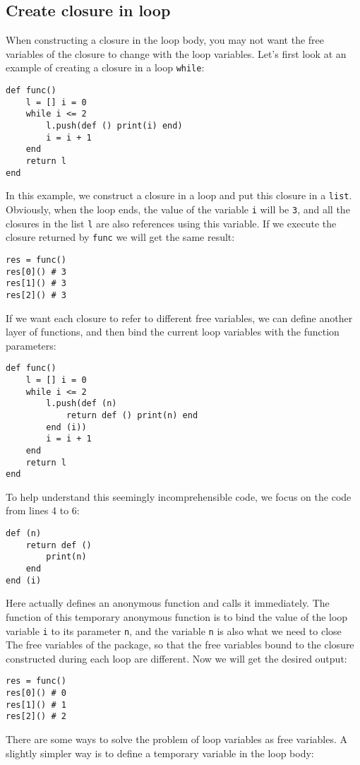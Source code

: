 \subsection {Create closure in loop}When constructing a closure in the loop body, you may not want the free variables of the closure to change with the loop variables. Let's first look at an example of creating a closure in a loop \texttt{while}:
\begin{lstlisting}[language=berry]
def func()
    l = [] i = 0
    while i <= 2
        l.push(def () print(i) end)
        i = i + 1
    end
    return l
end
\end{lstlisting}
In this example, we construct a closure in a loop and put this closure in a \texttt{list}. Obviously, when the loop ends, the value of the variable \texttt{i} will be \texttt{3}, and all the closures in the list \texttt{l} are also references using this variable. If we execute the closure returned by \texttt{func} we will get the same result:
\begin{lstlisting}[language=berry]
res = func()
res[0]() # 3
res[1]() # 3
res[2]() # 3
\end{lstlisting}
If we want each closure to refer to different free variables, we can define another layer of functions, and then bind the current loop variables with the function parameters:
\begin{lstlisting}[language=berry]
def func()
    l = [] i = 0
    while i <= 2
        l.push(def (n)
            return def () print(n) end
        end (i))
        i = i + 1
    end
    return l
end
\end{lstlisting}
To help understand this seemingly incomprehensible code, we focus on the code from lines 4 to 6:
\begin{lstlisting}[language=berry]
def (n)
    return def ()
        print(n)
    end
end (i)
\end{lstlisting}
Here actually defines an anonymous function and calls it immediately. The function of this temporary anonymous function is to bind the value of the loop variable \texttt{i} to its parameter \texttt{n}, and the variable \texttt{n} is also what we need to close The free variables of the package, so that the free variables bound to the closure constructed during each loop are different. Now we will get the desired output:
\begin{lstlisting}[language=berry]
res = func()
res[0]() # 0
res[1]() # 1
res[2]() # 2
\end{lstlisting}
There are some ways to solve the problem of loop variables as free variables. A slightly simpler way is to define a temporary variable in the loop body:
